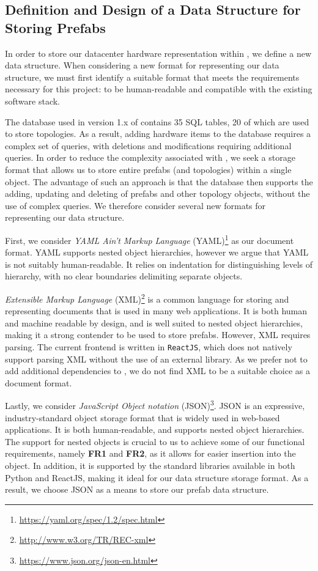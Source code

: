 \documentclass[11pt]{article}
\begin{document}
	\subsection{Definition and Design of a Data Structure for Storing Prefabs}
		In order to store our datacenter hardware representation within \opendc{}, we define a new data structure.
		When considering a new format for representing our data structure, we must first identify a suitable format that meets the requirements necessary for this project: to be human-readable and compatible with the existing \opendc{} software stack.

		The database used in version 1.x of \opendc{} contains 35 SQL tables, 20 of which are used to store topologies.
		As a result, adding hardware items to the database requires a complex set of queries, with deletions and modifications requiring additional queries.
		In order to reduce the complexity associated with \opendc{}, we seek a storage format that allows us to store entire prefabs (and topologies) within a single object.
		The advantage of such an approach is that the database then supports the adding, updating and deleting of prefabs and other topology objects, without the use of complex queries.
		We therefore consider several new formats for representing our data structure.

		First, we consider \textit{YAML Ain't Markup Language} (YAML)\footnote{\url{https://yaml.org/spec/1.2/spec.html}} as our document format.
		YAML supports nested object hierarchies, however we argue that YAML is not suitably human-readable.
		It relies on indentation for distinguishing levels of hierarchy, with no clear boundaries delimiting separate objects.

		\textit{Extensible Markup Language} (XML)\footnote{\url{http://www.w3.org/TR/REC-xml}} is a common language for storing and representing documents that is used in many web applications.
		It is both human and machine readable by design, and is well suited to nested object hierarchies, making it a strong contender to be used to store prefabs.
		However, XML requires parsing.
		The current \opendc{} frontend is written in \verb|ReactJS|, which does not natively support parsing XML without the use of an external library.
		As we prefer not to add additional dependencies to \opendc{}, we do not find XML to be a suitable choice as a document format.

		Lastly, we consider \textit{JavaScript Object notation} (JSON)\footnote{\url{https://www.json.org/json-en.html}}.
		JSON is an expressive, industry-standard object storage format that is widely used in web-based applications.
		It is both human-readable, and supports nested object hierarchies.
		The support for nested objects is crucial to us to achieve some of our functional requirements, namely \textbf{FR1} and \textbf{FR2}, as it allows for easier insertion into the object.
		In addition, it is supported by the standard libraries available in both Python and ReactJS, making it ideal for our data structure storage format.
		As a result, we choose JSON as a means to store our prefab data structure.
		
\end{document}
